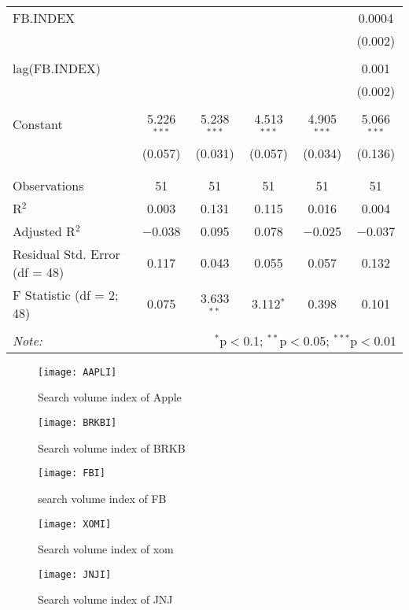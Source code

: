 \documentclass[12pt,english]{article}
\begin{document}
\begin{table}[!htbp]
{\begin{tabular}{@{\extracolsep{5pt}}lccccc}
 FB.INDEX &  &  &  &  & 0.0004 \\ 
  &  &  &  &  & (0.002) \\ 
  & & & & & \\ 
 lag(FB.INDEX) &  &  &  &  & 0.001 \\ 
  &  &  &  &  & (0.002) \\ 
  & & & & & \\ 
 Constant & 5.226$^{***}$ & 5.238$^{***}$ & 4.513$^{***}$ & 4.905$^{***}$ & 5.066$^{***}$ \\ 
  & (0.057) & (0.031) & (0.057) & (0.034) & (0.136) \\ 
  & & & & & \\ 
\hline \\[-1.8ex] 
Observations & 51 & 51 & 51 & 51 & 51 \\ 
R$^{2}$ & 0.003 & 0.131 & 0.115 & 0.016 & 0.004 \\ 
Adjusted R$^{2}$ & $-$0.038 & 0.095 & 0.078 & $-$0.025 & $-$0.037 \\ 
Residual Std. Error (df = 48) & 0.117 & 0.043 & 0.055 & 0.057 & 0.132 \\ 
F Statistic (df = 2; 48) & 0.075 & 3.633$^{**}$ & 3.112$^{*}$ & 0.398 & 0.101 \\ 
\hline 
\hline \\[-1.8ex] 
\textit{Note:}  & \multicolumn{5}{r}{$^{*}$p$<$0.1; $^{**}$p$<$0.05; $^{***}$p$<$0.01} \\ 
\end{tabular} 
}
\end{table} 

\pagebreak
\begin{figure}
    \centering
    \texttt{[image: AAPLI]}
    \caption{Search volume index of Apple}
\end{figure}

\begin{figure}
    \centering
    \texttt{[image: BRKBI]}
    \caption{Search volume index of BRKB}
    \label{a}
\end{figure}

\begin{figure}
    \centering
    \texttt{[image: FBI]}
    \caption{search volume index of FB}
    \label{a}
\end{figure}

\begin{figure}
    \centering
    \texttt{[image: XOMI]}
    \caption{Search volume index of xom}
    \label{a}
\end{figure}

\begin{figure}
    \centering
    \texttt{[image: JNJI]}
    \caption{Search volume index of JNJ}
    \label{a}
\end{figure}
\end{document}
